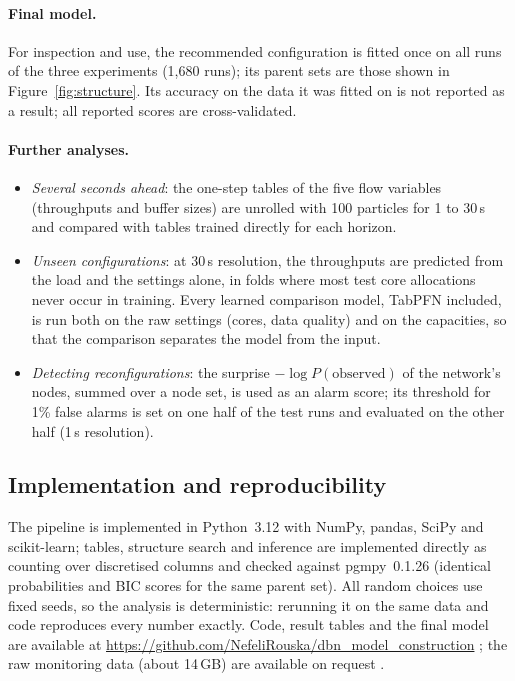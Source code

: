 \paragraph{Final model.}
For inspection and use, the recommended configuration is fitted once on all runs of the three experiments (1{,}680 runs); its parent sets are those shown in Figure~\ref{fig:structure}.
Its accuracy on the data it was fitted on is not reported as a result; all reported scores are cross-validated.

\paragraph{Further analyses.}
\begin{itemize}
  \item \emph{Several seconds ahead}: the one-step tables of the five flow variables (throughputs and buffer sizes) are unrolled with 100 particles for 1 to 30\,s and compared with tables trained directly for each horizon.
  \item \emph{Unseen configurations}: at 30\,s resolution, the throughputs are predicted from the load and the settings alone, in folds where most test core allocations never occur in training. Every learned comparison model, TabPFN included, is run both on the raw settings (cores, data quality) and on the capacities, so that the comparison separates the model from the input.
  \item \emph{Detecting reconfigurations}: the surprise $-\log P(\text{observed})$ of the network's nodes, summed over a node set, is used as an alarm score; its threshold for 1\% false alarms is set on one half of the test runs and evaluated on the other half (1\,s resolution).
\end{itemize}

\subsection{Implementation and reproducibility}

The pipeline is implemented in Python~3.12 with NumPy, pandas, SciPy and scikit-learn; tables, structure search and inference are implemented directly as counting over discretised columns and checked against pgmpy~0.1.26 (identical probabilities and BIC scores for the same parent set).
All random choices use fixed seeds, so the analysis is deterministic: rerunning it on the same data and code reproduces every number exactly.
Code, result tables and the final model are available at \url{https://github.com/NefeliRouska/dbn_model_construction} ; the raw monitoring data (about 14\,GB) are available on request .


